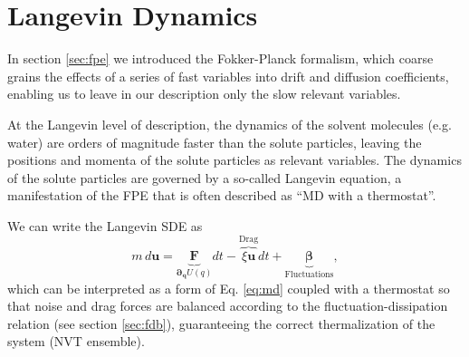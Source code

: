 \documentclass[twoside,openright,titlepage,numbers=noenddot,%
headinclude,footinclude,cleardoublepage=empty,abstract=on,
BCOR=5mm,fontsize=11pt, dvipsnames, paper=b5
]{scrreprt}
\renewcommand{\vec}[1]{\bm{#1}}
\newcommand{\ppos}{q}
\newcommand{\pvel}{u}
\begin{document}

\chapter{Langevin Dynamics}\label{sec:langevin}
In section \ref{sec:fpe} we introduced the Fokker-Planck formalism, which coarse grains the effects of a series of fast variables into drift and diffusion coefficients, enabling us to leave in our description only the slow relevant variables.

At the Langevin level of description, the dynamics of the solvent molecules (e.g. water) are orders of magnitude faster than the solute particles, leaving the positions and momenta of the solute particles as relevant variables. The dynamics of the solute particles are governed by a so-called Langevin equation, a manifestation of the \gls{FPE} that is often described as ``\gls{MD} with a thermostat''.

We can write the Langevin \gls{SDE} as
\begin{equation}
  \label{eq:langevin}
  m\, d\vec{\pvel} = \underbrace{\vec{F}}_{\vec{\partial}_{\vec{\ppos}}U(\ppos)}dt - \overbrace{\xi\vec{\pvel}}^{\text{Drag}}dt + \underbrace{\vec{\beta}}_{\text{Fluctuations}},
\end{equation}
which can be interpreted as a form of Eq. \eqref{eq:md} coupled with a thermostat so that noise and drag forces are balanced according to the fluctuation-dissipation relation (see section \ref{sec:fdb}), guaranteeing the correct thermalization of the system (NVT ensemble).
\end{document}
